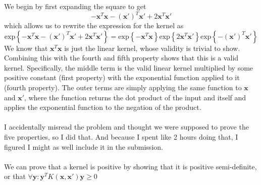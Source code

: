 \documentclass[submit]{harvardml}
\begin{document}
We begin by first expanding the square to get 
	$$-  \mathbf{x}^T\mathbf{x} - (\mathbf{x'})^T\mathbf{x'} + 2 \mathbf{x}^T\mathbf{x'}$$
which allows us to rewrite the expression for the kernel as 
	$$\text{exp}\left\{-  \mathbf{x}^T\mathbf{x} - (\mathbf{x'})^T\mathbf{x'} + 2 \mathbf{x}^T\mathbf{x'}\right\} = 
	\text{exp} \left\{-  \mathbf{x}^T\mathbf{x} \right\}\text{exp} \left\{2 \mathbf{x}^T\mathbf{x'}\right\} \text{exp} \left\{
	- (\mathbf{x'})^T\mathbf{x'}   \right\}$$
We know that $\mathbf{x}^T\mathbf{x}$ is just the linear kernel, whose validity is trivial to show. Combining this 
with the fourth and fifth property shows that this is a valid kernel. Specifically, the middle term is the valid linear kernel
multiplied by some positive constant (first property) with the exponential function applied to it (fourth property). The 
outer terms are simply applying the same function to $\mathbf{x}$ and $\mathbf{x'}$, where the function 
returns the dot product of the input and itself and applies the exponential function to the negation of the product.\\ \\
I accidentally misread the problem and thought we were supposed to prove the five properties, so I did that. And because I spent like 2 hours doing that, I figured I might as well include it in the submission. \\ \\
We can prove that a kernel is positive by showing that it is positive semi-definite, or that $\forall \mathbf{y}: 
\mathbf{y}^T K(\mathbf{x}, \mathbf{x'}) \mathbf{y} \geq 0$
\end{document}
